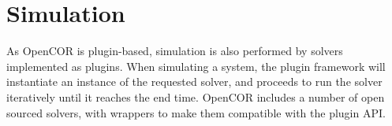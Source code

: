 \documentclass[\rootfolder/main.tex]{subfiles}
\begin{document}
\section{Simulation}

As OpenCOR is plugin-based, simulation is also performed by solvers implemented as plugins.
When simulating a system, the plugin framework will instantiate an instance of the requested solver, and proceeds to run the solver iteratively until it reaches the end time.
OpenCOR includes a number of open sourced solvers, with wrappers to make them compatible with the plugin API.
\end{document}
